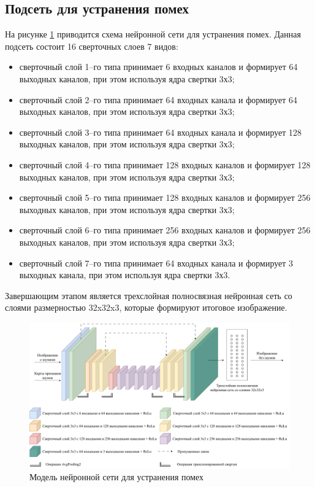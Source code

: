 \subsection{Подсеть для устранения помех}
На рисунке \ref{fig:my_unet} приводится схема нейронной сети для устранения помех. Данная подсеть состоит 16 сверточных слоев 7 видов:
\begin{itemize}
    \item сверточный слой 1--го типа принимает 6 входных каналов и формирует 64 выходных каналов, при этом используя ядра свертки 3х3; 
    \item сверточный слой 2--го типа принимает 64 входных канала и формирует 64 выходных каналов, при этом используя ядра свертки 3х3; 
    \item сверточный слой 3--го типа принимает 64 входных канала и формирует 128 выходных каналов, при этом используя ядра свертки 3х3; 
    \item сверточный слой 4--го типа принимает 128 входных каналов и формирует 128 выходных каналов, при этом используя ядра свертки 3х3; 
    \item сверточный слой 5--го типа принимает 128 входных каналов и формирует 256 выходных каналов, при этом используя ядра свертки 3х3; 
    \item сверточный слой 6--го типа принимает 256 входных каналов и формирует 256 выходных каналов, при этом используя ядра свертки 3х3; 
    \item сверточный слой 7--го типа принимает 64 входных канала и формирует 3 выходных канала, при этом используя ядра свертки 3х3. 
\end{itemize}

Завершающим этапом является трехслойная полносвязная нейронная сеть со слоями размерностью 32x32x3, которые формируют итоговое изображение.

\begin{figure}[h!btp]
	\centering
	\includegraphics[scale = 0.45]{inc/design/unet.pdf}
	\caption{Модель нейронной сети для устранения помех}
	\label{fig:my_unet}	
\end{figure}

